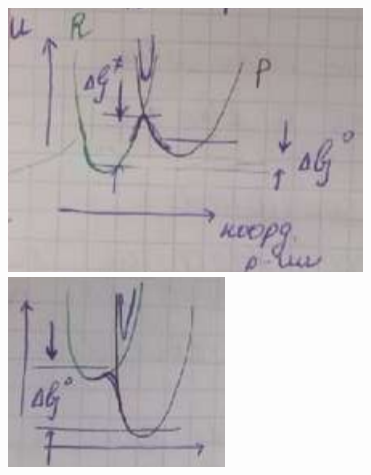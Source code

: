 \begin{lecture}
\begin{lecSection}
	\begin{figure}[H]
	\begin{minipage}[h]{0.26\linewidth}
		\centering\includegraphics[width=\linewidth]{lecture_04/graph1}
	\end{minipage}
	\hfill
	\begin{minipage}[h]{0.30\linewidth}
		\centering\includegraphics[width=\linewidth]{lecture_04/graph2}
	\end{minipage}
	\hfill
	\begin{minipage}[h]{0.28\linewidth}

\end{minipage}
\end{figure}
\end{lecSection}
\end{lecture}
